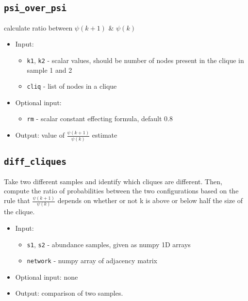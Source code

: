 \documentclass[10pt]{article}
\theoremstyle{definition}
\numberwithin{theorem}{section}
\numberwithin{definition}{section}
\numberwithin{lemma}{section}
\numberwithin{corollary}{section}
\numberwithin{clm}{section}
\numberwithin{rmk}{section}
\begin{document}
\cprotect \subsection{\verb|psi_over_psi|}
calculate ratio between $\psi(k+1)$ \& $\psi(k)$

\begin{itemize}
	\item Input: 
		\begin{itemize}
			\item \verb|k1|, \verb|k2| - scalar values, should be number of nodes present in the clique in sample 1 and 2
			\item \verb|cliq| - list of nodes in a clique
		\end{itemize}
	\item Optional input:
	\begin{itemize}
		\item \verb|rm| - scalar constant effecting formula, default $0.8$
	\end{itemize}
	\item Output: value of $\frac{\psi(k+1)}{\psi(k)}$ estimate
\end{itemize}

\cprotect \subsection{\verb|diff_cliques|}
Take two different samples and identify which cliques are different. Then, compute the
ratio of probabilities between the two configurations based on the rule that 
$\frac{\psi(k+1)}{\psi(k)}$ depends on whether or not k is above or below half the size of the clique. 
\begin{itemize}
	\item Input: 
		\begin{itemize}
		\item \verb|s1|, \verb|s2| - abundance samples, given as numpy 1D arrays
		\item \verb|network| - numpy array of adjacency matrix
	\end{itemize}
	\item Optional input: none
	\item Output: comparison of two samples.
\end{itemize}
\end{document}
